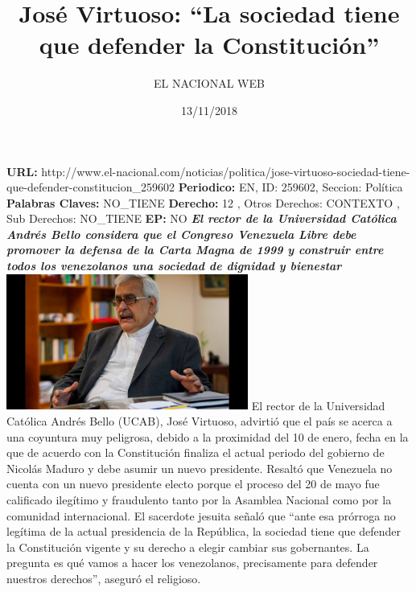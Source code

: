 \documentclass{article}%
\title{\textbf{José Virtuoso: “La sociedad tiene que defender la Constitución”}}%
\author{EL NACIONAL WEB}%
\date{13/11/2018}%
\begin{document}
%
\normalsize%
\maketitle%
\textbf{URL: }%
http://www.el{-}nacional.com/noticias/politica/jose{-}virtuoso{-}sociedad{-}tiene{-}que{-}defender{-}constitucion\_259602\newline%
%
\textbf{Periodico: }%
EN, %
ID: %
259602, %
Seccion: %
Política\newline%
%
\textbf{Palabras Claves: }%
NO\_TIENE\newline%
%
\textbf{Derecho: }%
12%
, Otros Derechos: %
CONTEXTO%
, Sub Derechos: %
NO\_TIENE%
\newline%
%
\textbf{EP: }%
NO\newline%
\newline%
%
\textbf{\textit{El rector de la Universidad Católica Andrés Bello considera que el Congreso Venezuela Libre debe promover la defensa de la Carta Magna de 1999 y construir entre todos los venezolanos una sociedad de dignidad y bienestar}}%
\newline%
\newline%
%
\includegraphics[width=300px]{66.jpg}%
\newline%
%
El rector de la Universidad Católica Andrés Bello (UCAB), José Virtuoso, advirtió que el país se acerca a una coyuntura muy peligrosa, debido a la proximidad del 10 de enero, fecha en la que de acuerdo con la Constitución finaliza el actual periodo del gobierno de Nicolás Maduro y debe asumir un nuevo presidente.%
\newline%
%
Resaltó que Venezuela no cuenta con un nuevo presidente electo porque el proceso del 20 de mayo fue calificado ilegítimo y fraudulento tanto por la Asamblea Nacional como por la comunidad internacional.%
\newline%
%
El sacerdote jesuita señaló que “ante esa prórroga no legítima de la actual presidencia de la República, la sociedad tiene que defender la Constitución vigente y su derecho a elegir cambiar sus gobernantes. La pregunta es qué vamos a hacer los venezolanos, precisamente para defender nuestros derechos”, aseguró el religioso.%
\end{document}
